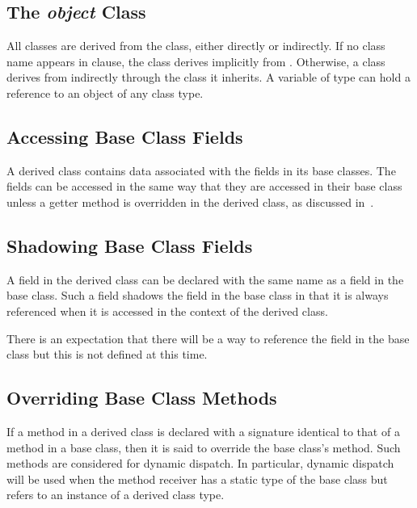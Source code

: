 \subsection{The {\em object} Class}
\label{The_object_Class}

All classes are derived from the  class, either directly or
indirectly.  If no class name appears in  clause, the class derives
implicitly from .  Otherwise, a class derives from 
indirectly through the class it inherits.  A variable of type 
can hold a reference to an object of any class type.

\subsection{Accessing Base Class Fields}
\label{Accessing_Base_Class_Fields}

A derived class contains data associated with the fields in its base
classes.  The fields can be accessed in the same way that they are
accessed in their base class unless a getter method is
overridden in the derived class, as discussed
in~.

\subsection{Shadowing Base Class Fields}
\label{Shadowing_Base_Class_Fields}
A field in the derived class can be declared with the same name as a
field in the base class.  Such a field shadows the field in the base
class in that it is always referenced when it is accessed in the
context of the derived class.

\begin{openissue}
There is an expectation that there will
be a way to reference the field in the base class but this is not
defined at this time.
\end{openissue}

\subsection{Overriding Base Class Methods}
\label{Overriding_Base_Class_Methods}

If a method in a derived class is declared with a signature identical to
that of a method in a base class, then it is said to override the base
class's method. Such methods are considered for dynamic dispatch.  In
particular, dynamic dispatch will be used when the method receiver has a
static type of the base class but refers to an instance of a derived
class type.

